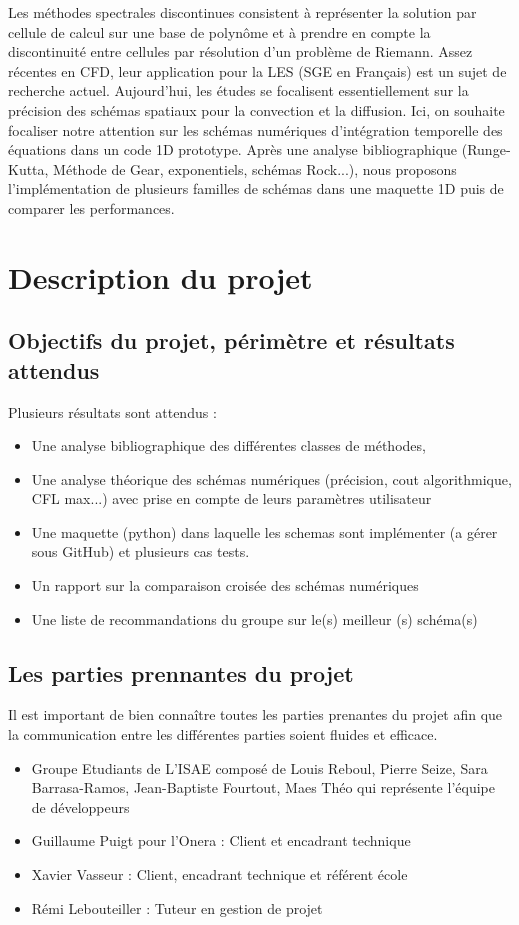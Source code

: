 \documentclass[a4paper,12pt]{report}
\theoremstyle{break}
\begin{document}
Les méthodes spectrales discontinues consistent à représenter la solution par cellule de calcul sur une base de polynôme et à prendre en compte la discontinuité entre cellules par résolution d’un problème de Riemann. Assez récentes en CFD, leur application pour la LES (SGE en Français) est un sujet de recherche actuel. Aujourd’hui, les études se focalisent essentiellement sur la précision des schémas spatiaux pour la convection et la diffusion. Ici, on souhaite focaliser notre attention sur les schémas numériques d’intégration temporelle des équations dans un code 1D prototype. Après une analyse bibliographique (Runge‐Kutta, Méthode de Gear, exponentiels, schémas Rock...), nous proposons l'implémentation de plusieurs familles de schémas dans une maquette 1D puis de comparer les performances.

\chapter{Description du projet}

\section{Objectifs du projet, périmètre et résultats attendus}
    Plusieurs résultats sont attendus : 
\begin{itemize}[label=\textbullet,]
		\item Une analyse bibliographique des différentes classes de méthodes, 
		\item Une analyse théorique des schémas numériques (précision, cout algorithmique, CFL max...) avec prise en compte de leurs paramètres utilisateur 
		\item Une maquette (python) dans laquelle les schemas sont implémenter (a gérer sous 
        GitHub) et plusieurs cas tests. 
		\item Un rapport sur la comparaison croisée des schémas numériques
		\item Une liste de recommandations du groupe sur le(s) meilleur (s) schéma(s)
	\end{itemize}
	
\section{Les parties prennantes du projet}	
   Il est important de bien connaître toutes les parties prenantes du projet afin que la communication entre les différentes parties soient fluides et efficace. 
   \begin{itemize}[label=\textbullet]
   	\item Groupe Etudiants de L’ISAE composé de Louis Reboul, Pierre Seize, Sara Barrasa-Ramos, Jean-Baptiste Fourtout, Maes Théo qui représente l’équipe de développeurs
   	\item Guillaume  Puigt pour l'Onera : Client et encadrant technique
   	\item Xavier Vasseur : Client, encadrant technique et référent école
   	\item Rémi Lebouteiller : Tuteur en gestion de projet
    \end{itemize}
\end{document}
